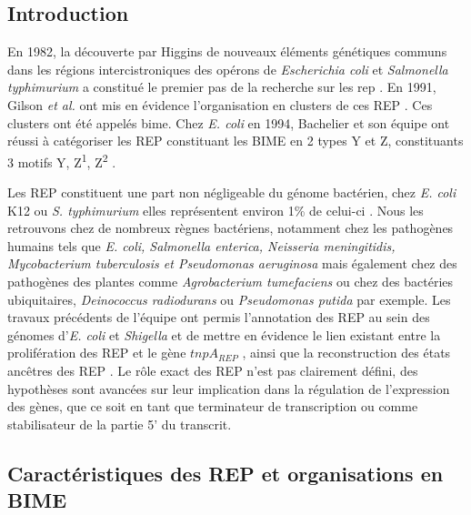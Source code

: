\documentclass[12pt,a4paper]{report}
\begin{document}
\begin{onehalfspace}

\cleardoublepage
{}
	
\tableofcontents

\cleardoublepage
{}


\chapter*{Introduction}
\setcounter{page}{1}

En 1982, la découverte par Higgins de nouveaux éléments génétiques communs dans les régions intercistroniques des opérons de \textit{Escherichia coli} et \textit{Salmonella typhimurium} a constitué le premier pas de la recherche sur les \gls{rep} \citep{Higgins1982}. En 1991, Gilson \textit{et al.} ont mis en évidence l'organisation en clusters de ces REP \citep{Gilson1991}. Ces clusters ont été appelés \gls{bime}. Chez \textit{E. coli} en 1994, Bachelier et son équipe ont réussi à catégoriser les REP constituant les BIME en 2 types Y et Z, constituants 3 motifs Y, Z\textsuperscript{1}, Z\textsuperscript{2}  \citep{Bachellier1994}.
 
Les REP constituent une part non négligeable du génome bactérien, chez \textit{E. coli} K12 ou \textit{S. typhimurium} elles représentent environ 1\% de celui-ci \citep{Gilson1991}. Nous les retrouvons chez de nombreux règnes bactériens, notamment chez les pathogènes humains tels que \textit{E. coli, Salmonella enterica, Neisseria meningitidis, Mycobacterium tuberculosis et Pseudomonas aeruginosa} mais également chez des pathogènes des plantes comme \textit{Agrobacterium tumefaciens} ou chez des bactéries ubiquitaires, \textit{Deinococcus radiodurans} ou \textit{Pseudomonas putida} par exemple. Les travaux précédents de l'équipe ont permis l'annotation des REP au sein des génomes d'\textit{E. coli} et \textit{Shigella} et de mettre en évidence le lien existant entre la prolifération des REP et le gène $tnpA_{REP}$ \citep{Weyder2013,Bosc2014}, ainsi que la reconstruction des états ancêtres des REP \citep{Bosc2014}. Le rôle exact des REP n'est pas clairement défini, des hypothèses sont avancées sur leur implication dans la régulation de l'expression des gènes, que ce soit en tant que terminateur de transcription ou comme stabilisateur de la partie 5' du transcrit.

\section*{Caractéristiques des REP et organisations en BIME}


\end{onehalfspace}
\end{document}
